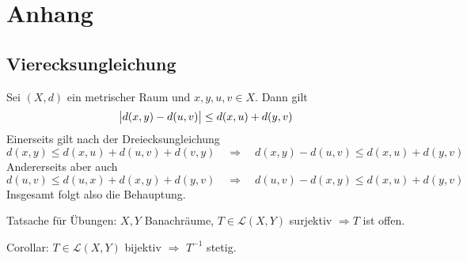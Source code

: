 \cleardoubleoddemptypage
\appendix
\section{Anhang} %
\label{sec:anhang}

\subsection{Vierecksungleichung} %
\label{sub:vier_ungl}
Sei $(X,d)$ ein metrischer Raum und $x,y,u,v \in X$. Dann gilt
\[
	\abs[\big]{d(x,y) - d(u,v)} \le d(x,u) + d(y,v) 
\]
Einerseits gilt nach der Dreiecksungleichung
\[
	d(x,y) \le d(x,u) + d(u,v) + d(v,y) \quad \Longrightarrow \quad d(x,y) - d(u,v) \le d(x,u) + d(y,v)
\]
Andererseits aber auch
\[
	d(u,v) \le d(u,x) + d(x,y) + d(y,v) \quad \Longrightarrow \quad d(u,v) - d(x,y) \le d(x,u) + d(y,v)
\]
Insgesamt folgt also die Behauptung. \bewende

Tatsache für Übungen: $X,Y$ Banachräume, $T \in \mathcal{L}(X,Y)$ surjektiv $\Rightarrow T$ ist offen.

Corollar: $T \in \mathcal{L}(X,Y)$ bijektiv $\Rightarrow $ $T ^{-1}$ stetig.

\cleardoubleoddemptypage
{}
\setcounter{page}{1}
\printindex
\listoffigures
\todototoc
{}

